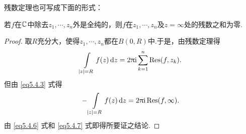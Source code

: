 残数定理也可写成下面的形式：
\begin{theorem}\label{thm5.4.12}
若$f$在$\mathbb C$中除去$z_1,\cdots,z_n$外是全纯的，则$f$在$z_1,\cdots,z_n$及$z=\infty$处的残数之和为零.
\end{theorem}
\begin{proof}
取$R$充分大，使得$z_1,\cdots,z_n$都在$B(0,R)$中.于是，由残数定理得
\begin{equation}\label{eq5.4.6}
\int\limits_{|z|=R}f(z)\mathop{}\!\mathrm dz=2\uppi\mathrm i\sum_{k=1}^n\operatorname*{Res}(f,z_k).
\end{equation}
但由 \eqref{eq5.4.3} 式得
\begin{equation}\label{eq5.4.7}
-\int\limits_{|z|=R}f(z)\mathop{}\!\mathrm dz=2\uppi\mathrm i\operatorname*{Res}(f,\infty).
\end{equation}
由 \eqref{eq5.4.6} 式和 \eqref{eq5.4.7} 式即得所要证之结论.
\end{proof}

